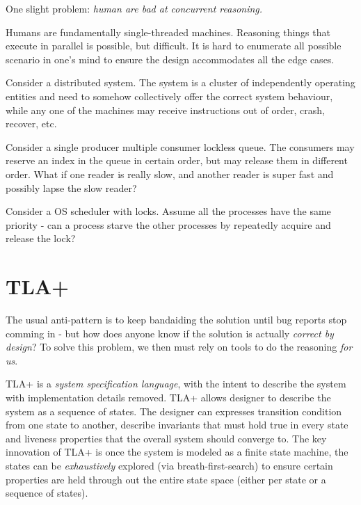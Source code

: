 \documentclass{report}
\begin{document}
One slight problem: \textit{human are bad at concurrent reasoning.}\newline

Humans are fundamentally single-threaded machines. Reasoning things that execute
in parallel is possible, but difficult. It is hard to enumerate all possible
scenario in one's mind to ensure the design accommodates all the edge cases. 
\newline

Consider a distributed system. The system is a cluster of independently
operating entities and need to somehow collectively offer the correct system
behaviour, while any one of the machines may receive instructions out of order,
crash, recover, etc. \newline

Consider a single producer multiple consumer lockless queue. The consumers may 
reserve an index in the queue in certain order, but may release them in different order. 
What if one reader is really slow, and another reader is super fast and possibly 
lapse the slow reader? \newline

Consider a OS scheduler with locks. Assume all the processes have the same
priority - can a process starve the other processes by repeatedly acquire and release 
the lock?\newline

\section{TLA+}

The usual anti-pattern is to keep bandaiding the solution until bug reports stop
comming in - but how does anyone know if the solution is actually
\textit{correct by design}? To solve this problem, we then must rely on tools to
do the reasoning \textit{for us}.\newline 

TLA+ is a \textit{system specification language}, with the intent to describe
the system with implementation details removed. TLA+ allows designer to describe
the system as a sequence of states.  The designer can expresses transition
condition from one state to another, describe invariants that must hold true in
every state and liveness properties that the overall system should converge to.
The key innovation of TLA+ is once the system is modeled as a finite state
machine, the states can be \textit{exhaustively} explored (via
breath-first-search) to ensure certain properties are held through out the
entire state space (either per state or a sequence of states).\newline
\end{document}
